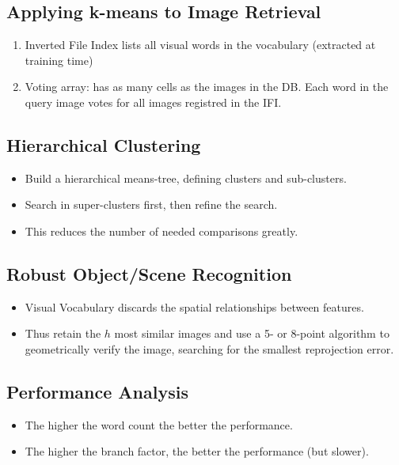 \documentclass[10pt,a4paper]{scrartcl}
\begin{document}
\begin{multicols*}{2}
\subsection{Applying k-means to Image Retrieval}

\begin{enumerate}
\item Inverted File Index lists all visual words in the vocabulary (extracted at training time)
\item Voting array: has as many cells as the images in the DB. Each word in the query image votes for all images registred in the IFI.
\end{enumerate}

\subsection{Hierarchical Clustering}

\begin{itemize}
\item Build a hierarchical means-tree, defining clusters and sub-clusters.
\item Search in super-clusters first, then refine the search.
\item This reduces the number of needed comparisons greatly.
\end{itemize}

\subsection{Robust Object/Scene Recognition}

\begin{itemize}
\item Visual Vocabulary discards the spatial relationships between features.
\item Thus retain the $h$ most similar images and use a 5- or 8-point algorithm to geometrically verify the image, searching for the smallest reprojection error.
\end{itemize}

\subsection{Performance Analysis}


\begin{itemize}
\item The higher the word count the better the performance.
\item The higher the branch factor, the better the performance (but slower).
\end{itemize}


\end{multicols*}
\end{document}
